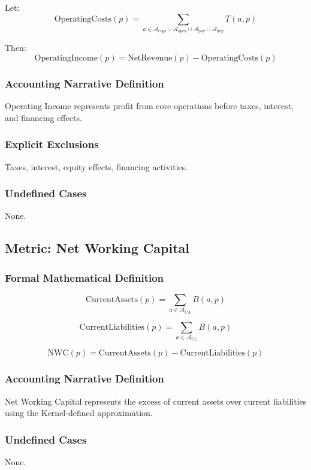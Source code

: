 \documentclass[11pt]{article}
\newcommand{\AccountSet}[1]{\mathcal{A}_{\text{#1}}}
\newcommand{\Balance}{B}
\newcommand{\Total}{T}
\newcommand{\Period}{p}
\begin{document}
Let:
\[
\text{OperatingCosts}(\Period)
=
\sum_{a \in \AccountSet{cogs} \cup \AccountSet{opex} \cup
           \AccountSet{pay} \cup \AccountSet{dep}}
\Total(a, \Period)
\]

Then:
\[
\text{OperatingIncome}(\Period)
=
\text{NetRevenue}(\Period) - \text{OperatingCosts}(\Period)
\]

\subsubsection*{Accounting Narrative Definition}
Operating Income represents profit from core operations before
taxes, interest, and financing effects.

\subsubsection*{Explicit Exclusions}
Taxes, interest, equity effects, financing activities.

\subsubsection*{Undefined Cases}
None.

\subsection{Metric: Net Working Capital}

\subsubsection*{Formal Mathematical Definition}

\[
\text{CurrentAssets}(\Period)
= \sum_{a \in \AccountSet{CA}} \Balance(a, \Period)
\]

\[
\text{CurrentLiabilities}(\Period)
= \sum_{a \in \AccountSet{CL}} \Balance(a, \Period)
\]

\[
\text{NWC}(\Period)
=
\text{CurrentAssets}(\Period)
-
\text{CurrentLiabilities}(\Period)
\]

\subsubsection*{Accounting Narrative Definition}
Net Working Capital represents the excess of current assets over
current liabilities using the Kernel-defined approximation.

\subsubsection*{Undefined Cases}
None.
\end{document}
